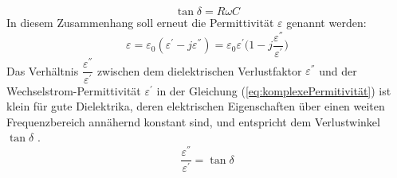 \begin{equation} \label{eq:VerlustwinkelKondensator}
\tan \delta = R \omega C
\end{equation}
In diesem Zusammenhang soll erneut die Permittivität $\varepsilon$ genannt werden:
\begin{equation} \label{eq:komplexePermitivität}
\varepsilon=\varepsilon_0(\varepsilon^{'}-j\varepsilon^{''})=\varepsilon_0\varepsilon^{'}\big(1-j\dfrac{\varepsilon^{''}}{\varepsilon^{'}}\big)
\end{equation}
Das Verhältnis $\dfrac{\varepsilon^{''}}{\varepsilon^{'}}$ zwischen dem dielektrischen Verlustfaktor $\varepsilon^{''}$ und der Wechselstrom-Permittivität $\varepsilon^{'}$ in der Gleichung (\ref{eq:komplexePermitivität}) ist klein für gute Dielektrika, deren elektrischen Eigenschaften über einen weiten Frequenzbereich annähernd konstant sind, und entspricht dem Verlustwinkel $\tan\delta$ \cite{elliott1981antenna}. 
\begin{equation} \label{eq:VerlustwinkelEpsilonPermitivität}
\dfrac{\varepsilon^{''}}{\varepsilon^{'}}=\tan\delta
\end{equation}
\newpage

